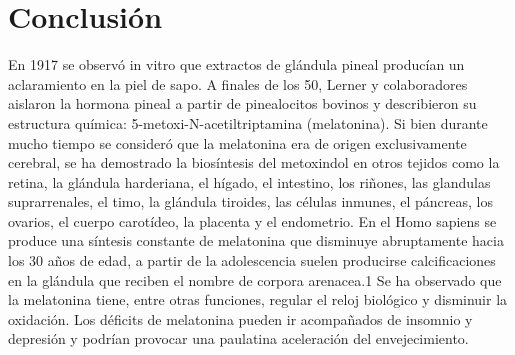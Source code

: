 \documentclass[a4paper,twocolumn,10pt]{article}
\begin{document}
\section{Conclusión}
En 1917 se observó in vitro que extractos de glándula pineal producían un aclaramiento en la piel de sapo. A finales de los 50, Lerner y colaboradores aislaron la hormona pineal a partir de pinealocitos bovinos y describieron su estructura química: 5-metoxi-N-acetiltriptamina (melatonina). Si bien durante mucho tiempo se consideró que la melatonina era de origen exclusivamente cerebral, se ha demostrado la biosíntesis del metoxindol en otros tejidos como la retina, la glándula harderiana, el hígado, el intestino, los riñones, las glandulas suprarrenales, el timo, la glándula tiroides, las células inmunes, el páncreas, los ovarios, el cuerpo carotídeo, la placenta y el endometrio.
En el Homo sapiens se produce una síntesis constante de melatonina que disminuye abruptamente hacia los 30 años de edad, a partir de la adolescencia suelen producirse calcificaciones en la glándula que reciben el nombre de corpora arenacea.1​ Se ha observado que la melatonina tiene, entre otras funciones, regular el reloj biológico y disminuir la oxidación. Los déficits de melatonina pueden ir acompañados de insomnio y depresión y podrían provocar una paulatina aceleración del envejecimiento.


\end{document}
